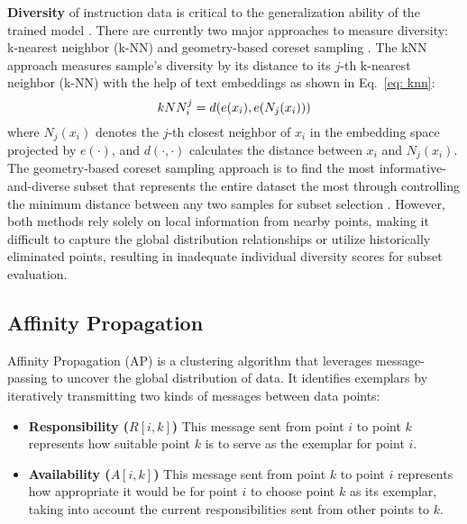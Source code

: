 \textbf{Diversity} of instruction data is critical to the generalization ability of the trained model \citep{ds-survey}. There are currently two major approaches to measure diversity: k-nearest neighbor (k-NN) \citep{indiv_eval_semantic1} and geometry-based coreset sampling \citep{indiv_eval_coreset1}. 
The kNN approach measures sample's diversity by its distance to its $j$-th k-nearest neighbor (k-NN) with the help of text embeddings as shown in Eq.~\ref{eq: knn}:
\begin{equation}
\small
\label{eq: knn}
    kNN_i^j = d(e(x_i), e(N_j(x_i)))
\end{equation}
where $N_j(x_i)$ denotes the $j$-th closest neighbor of $x_i$ in the embedding space projected by $e(\cdot)$, and $d(\cdot, \cdot)$ calculates the distance between $x_i$ and $N_j(x_i)$.
The geometry-based coreset sampling approach is to find the most informative-and-diverse subset that represents the entire dataset the most through controlling the minimum distance between any two samples for subset selection \citep{indiv_eval_coreset1, indiv_eval_coreset2}. However, both methods rely solely on local information from nearby points, making it difficult to capture the global distribution relationships or utilize historically eliminated points, resulting in inadequate individual diversity scores for subset evaluation.

\subsection{Affinity Propagation}
\label{sec: ap}


Affinity Propagation (AP) \citep{cluster-ap} is a clustering algorithm that leverages message-passing to uncover the global distribution of data. It identifies exemplars by iteratively transmitting two kinds of messages between data points:

\begin{itemize}[nosep]
    \item \textbf{Responsibility ($R[i,k]$)} This message sent from point \(i\) to point \(k\) represents how suitable point \(k\) is to serve as the exemplar for point \(i\).
    \item \textbf{Availability ($A[i,k]$)} This message sent from point \(k\) to point \(i\) represents how appropriate it would be for point \(i\) to choose point \(k\) as its exemplar, taking into account the current responsibilities sent from other points to \(k\).
\end{itemize}

